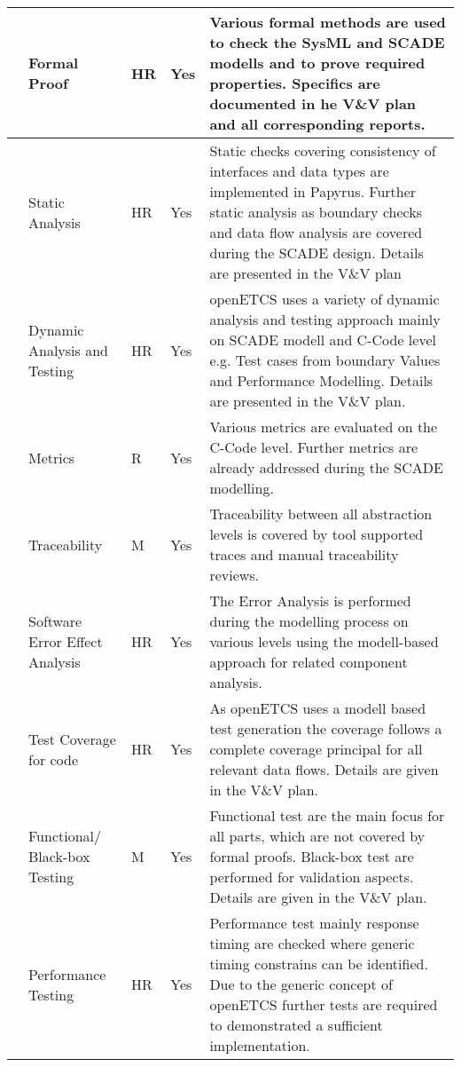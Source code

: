 \documentclass{template/openetcs_article}
\begin{document}
\begin{appendices}
\begin{center}
\begin{longtable}{|m{1cm}|m{5cm}|m{1cm}|m{2cm}|m{5cm}|}
\centering 1 &
Formal Proof &
\centering
HR &
\centering
Yes &
Various formal methods are used to check the SysML and SCADE modells and to prove required properties. Specifics are documented in he V\&V plan and all corresponding reports.\\\hline
\centering 2 &
Static Analysis &
\centering
HR &
\centering
Yes &
Static checks covering consistency of interfaces and data types are implemented in Papyrus. Further static analysis as boundary checks and data flow analysis are covered during the SCADE design. Details are presented in the V\&V plan\\\hline
\centering 3 &
Dynamic Analysis and Testing &
\centering
HR &
\centering
Yes &
openETCS uses a variety of dynamic analysis and testing approach mainly on SCADE modell and C-Code level e.g. Test cases from boundary Values and Performance Modelling. Details are presented in the V\&V plan.\\\hline
\centering 4 &
Metrics &
\centering
R &
\centering
Yes &
Various metrics are evaluated on the C-Code level. Further metrics are already addressed during the SCADE modelling. \\\hline
\centering 5 &
Traceability &
\centering
M &
\centering
Yes &
Traceability between all abstraction levels is covered by tool supported traces and manual traceability reviews.\\\hline
\centering 6 &
Software Error Effect Analysis &
\centering
HR &
\centering
Yes &
The Error Analysis is performed during the modelling process on various levels using the modell-based approach for related component analysis.\\\hline
\centering 7 &
Test Coverage for code &
\centering
HR &
\centering
Yes &
As openETCS uses a modell based test generation the coverage follows a complete coverage principal for all relevant data flows. Details are given in the V\&V plan.\\\hline
\centering 8 &
Functional/ Black-box Testing &
\centering
M &
\centering
Yes &
Functional test are the main focus for all parts, which are not covered by formal proofs. Black-box test are performed for validation aspects. Details are given in the V\&V plan.\\\hline
\centering 9 &
Performance Testing &
\centering
HR &
\centering
Yes &
Performance test mainly response timing are checked where generic timing constrains can be identified. Due to the generic concept of openETCS further tests are required to demonstrated a sufficient implementation.\\\hline

\end{longtable}
\end{center}
\end{appendices}
\end{document}
